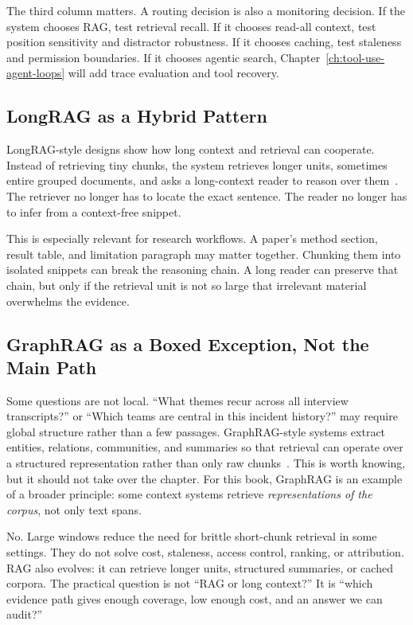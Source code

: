The third column matters. A routing decision is also a monitoring decision. If the system chooses RAG, test retrieval recall. If it chooses read-all context, test position sensitivity and distractor robustness. If it chooses caching, test staleness and permission boundaries. If it chooses agentic search, Chapter~\ref{ch:tool-use-agent-loops} will add trace evaluation and tool recovery.

\subsection{LongRAG as a Hybrid Pattern}

LongRAG-style designs show how long context and retrieval can cooperate. Instead of retrieving tiny chunks, the system retrieves longer units, sometimes entire grouped documents, and asks a long-context reader to reason over them~\cite{jiang2024longrag}. The retriever no longer has to locate the exact sentence. The reader no longer has to infer from a context-free snippet.

This is especially relevant for research workflows. A paper's method section, result table, and limitation paragraph may matter together. Chunking them into isolated snippets can break the reasoning chain. A long reader can preserve that chain, but only if the retrieval unit is not so large that irrelevant material overwhelms the evidence.

\subsection{GraphRAG as a Boxed Exception, Not the Main Path}

Some questions are not local. ``What themes recur across all interview transcripts?'' or ``Which teams are central in this incident history?'' may require global structure rather than a few passages. GraphRAG-style systems extract entities, relations, communities, and summaries so that retrieval can operate over a structured representation rather than only raw chunks~\cite{microsoft2026graphrag}. This is worth knowing, but it should not take over the chapter. For this book, GraphRAG is an example of a broader principle: some context systems retrieve \emph{representations of the corpus}, not only text spans.

\begin{tcolorbox}[colback=blue!5, colframe=blue!40, title=\textbf{Is RAG Dead When Context Windows Get Large?}]
No. Large windows reduce the need for brittle short-chunk retrieval in some settings. They do not solve cost, staleness, access control, ranking, or attribution. RAG also evolves: it can retrieve longer units, structured summaries, or cached corpora. The practical question is not ``RAG or long context?'' It is ``which evidence path gives enough coverage, low enough cost, and an answer we can audit?''
\end{tcolorbox}

